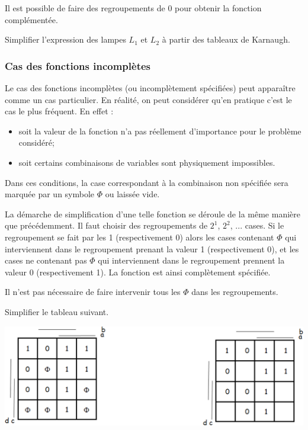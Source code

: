 \documentclass[11pt,oneside]{article}
\begin{document}
\begin{rem}
Il est possible de faire des regroupements de 0 pour obtenir la fonction complémentée. 
\end{rem}

\begin{exemple}
Simplifier l'expression des lampes $L_1$ et $L_2$ à partir des tableaux de Karnaugh.
\end{exemple}

\subsubsection{Cas des fonctions incomplètes}
Le cas des fonctions incomplètes (ou incomplètement spécifiées) peut apparaître comme un cas particulier. En réalité, on peut considérer qu'en pratique c'est le cas le plus fréquent. En effet : 
\begin{itemize}
\item soit la valeur de la fonction n'a pas réellement d'importance pour le problème considéré;
\item soit certains combinaisons de variables sont physiquement impossibles.
\end{itemize}
Dans ces conditions, la case correspondant à la combinaison non spécifiée sera marquée par un symbole $\Phi$ ou laissée vide. 

La démarche de simplification d'une telle fonction se déroule de la même manière que précédemment. Il faut choisir des regroupements de $2^1$, $2^2$, ... cases. Si le regroupement se fait par les 1 (respectivement 0) alors les cases contenant $\Phi$ qui interviennent dans le regroupement prenant la valeur 1 (respectivement 0), et les cases ne contenant pas $\Phi$ qui interviennent dans le regroupement prennent la valeur 0 (respectivement 1). La fonction est ainsi complètement spécifiée.

\begin{rem}
Il n'est pas nécessaire de faire intervenir tous les $\Phi$ dans les regroupements. 
\end{rem}

\begin{exemple}
Simplifier le tableau suivant. 

\begin{center}
\includegraphics[width=.6\textwidth]{png/fig_16}
\end{center}

\end{exemple}
\end{document}
